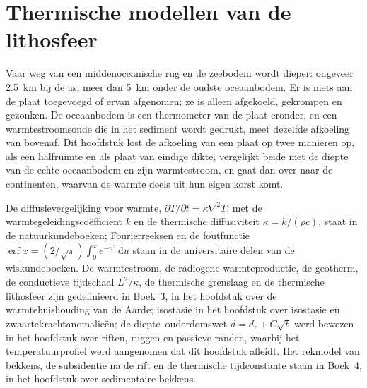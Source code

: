 \chapter{Thermische modellen van de lithosfeer}\label{ch:b3:lithosphere-thermal-models}

Vaar weg van een middenoceanische rug en de zeebodem wordt dieper: ongeveer
\qty{2.5}{km} bij de as, meer dan \qty{5}{km} onder de oudste
oceaanbodem. Er is niets aan de plaat toegevoegd of ervan afgenomen; ze is alleen
afgekoeld, gekrompen en gezonken. De oceaanbodem is een thermometer van de plaat
eronder, en een warmtestroomsonde die in het sediment wordt gedrukt, meet dezelfde
afkoeling van bovenaf. Dit hoofdstuk lost de afkoeling van een plaat op twee manieren op, als
een halfruimte en als plaat van eindige dikte, vergelijkt beide met de diepte
van de echte oceaanbodem en zijn warmtestroom, en gaat dan over naar de continenten,
waarvan de warmte deels uit hun eigen korst komt.

\begin{recall}
De diffusievergelijking voor warmte, $\partial T/\partial t = \kappa\nabla^2T$,
met de warmtegeleidingscoëfficiënt $k$ en de thermische diffusiviteit $\kappa =
k/(\rho c)$, staat in de natuurkundeboeken; Fourierreeksen en de foutfunctie
$\operatorname{erf}x = (2/\sqrt\pi)\int_0^xe^{-u^2}\,\mathrm du$ staan in de
universitaire delen van de wiskundeboeken. De warmtestroom, de radiogene
warmteproductie, de geotherm, de conductieve tijdschaal $L^2/\kappa$, de thermische
grenslaag en de thermische lithosfeer zijn gedefinieerd in Boek~3,
in het hoofdstuk over de warmtehuishouding van de Aarde; isostasie in het
hoofdstuk over isostasie en zwaartekrachtanomalieën; de diepte--ouderdomswet $d = d_r + C\sqrt t$ werd bewezen in
het hoofdstuk over riften, ruggen en passieve randen, waarbij het temperatuurprofiel
werd aangenomen dat dit hoofdstuk afleidt. Het rekmodel van bekkens, de subsidentie
na de rift en de thermische tijdconstante staan in Boek~4, in het
hoofdstuk over sedimentaire bekkens.
\end{recall}

